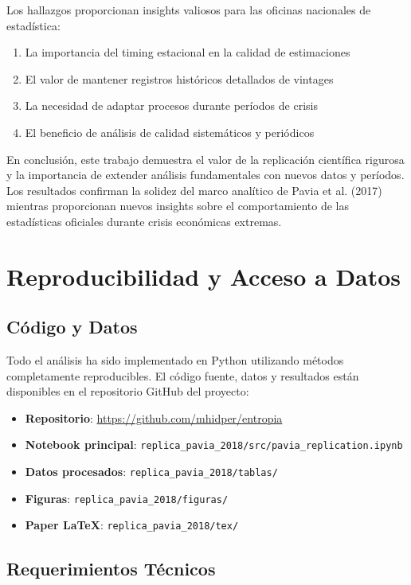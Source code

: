 \documentclass{article}
\begin{document}
Los hallazgos proporcionan insights valiosos para las oficinas nacionales de estadística:

\begin{enumerate}
\item La importancia del timing estacional en la calidad de estimaciones
\item El valor de mantener registros históricos detallados de vintages
\item La necesidad de adaptar procesos durante períodos de crisis
\item El beneficio de análisis de calidad sistemáticos y periódicos
\end{enumerate}

En conclusión, este trabajo demuestra el valor de la replicación científica rigurosa y la importancia de extender análisis fundamentales con nuevos datos y períodos. Los resultados confirman la solidez del marco analítico de Pavia et al. (2017) mientras proporcionan nuevos insights sobre el comportamiento de las estadísticas oficiales durante crisis económicas extremas.

\section{Reproducibilidad y Acceso a Datos}

\subsection{Código y Datos}

Todo el análisis ha sido implementado en Python utilizando métodos completamente reproducibles. El código fuente, datos y resultados están disponibles en el repositorio GitHub del proyecto:

\begin{itemize}
\item \textbf{Repositorio}: \url{https://github.com/mhidper/entropia}
\item \textbf{Notebook principal}: \texttt{replica\_pavia\_2018/src/pavia\_replication.ipynb}
\item \textbf{Datos procesados}: \texttt{replica\_pavia\_2018/tablas/}
\item \textbf{Figuras}: \texttt{replica\_pavia\_2018/figuras/}
\item \textbf{Paper LaTeX}: \texttt{replica\_pavia\_2018/tex/}
\end{itemize}

\subsection{Requerimientos Técnicos}
\end{document}
